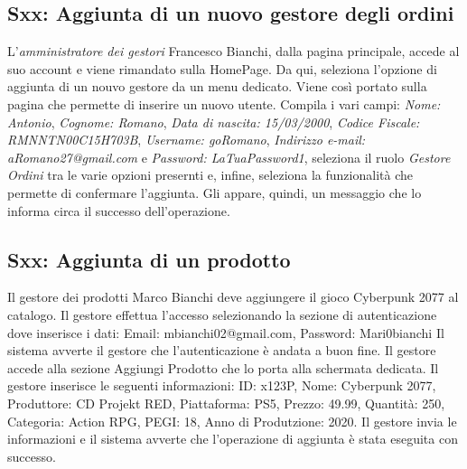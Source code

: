 \documentclass[12pt, a4paper, oneside]{book}
\begin{document}
    \subsection*{Sxx: Aggiunta di un nuovo gestore degli ordini}
        L'\textit{amministratore dei gestori} Francesco Bianchi, dalla pagina principale, accede al suo account e viene rimandato sulla HomePage.
            Da qui, seleziona l'opzione di aggiunta di un nouvo gestore da un menu dedicato. Viene così portato sulla pagina che permette di inserire un nuovo utente.
            Compila i vari campi: \textit{Nome: Antonio}, \textit{Cognome: Romano}, \textit{Data di nascita: 15/03/2000}, \textit{Codice Fiscale: RMNNTN00C15H703B},
            \textit{Username: goRomano}, \textit{Indirizzo e-mail: aRomano27@gmail.com} e \textit{Password: LaTuaPassword1}, seleziona il ruolo \textit{Gestore Ordini} tra le
            varie opzioni presernti e, infine, seleziona la funzionalità che permette di confermare l'aggiunta. Gli appare, quindi, un messaggio che lo informa circa il successo
            dell'operazione.

    \subsection*{Sxx: Aggiunta di un prodotto}
        Il gestore dei prodotti Marco Bianchi deve aggiungere il gioco Cyberpunk 2077 al catalogo. Il gestore
        effettua l'accesso selezionando la sezione di autenticazione dove inserisce i dati: Email: mbianchi02@gmail.com, Password: Mari0bianchi
        Il sistema avverte il gestore che l'autenticazione è andata a buon fine. Il gestore accede alla sezione
        Aggiungi Prodotto che lo porta alla schermata dedicata. Il gestore inserisce le seguenti informazioni:
        ID: x123P, Nome: Cyberpunk 2077, Produttore: CD Projekt RED, Piattaforma: PS5, Prezzo: 49.99, Quantità: 250,
        Categoria: Action RPG, PEGI: 18, Anno di Produtzione: 2020. Il gestore invia le informazioni
        e il sistema avverte che l'operazione di aggiunta è stata eseguita con successo.
\end{document}

